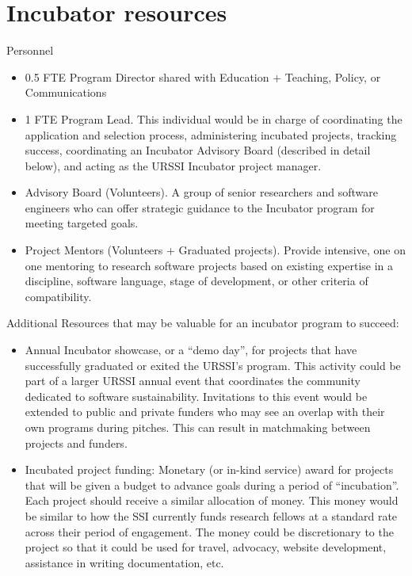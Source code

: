 \documentclass[
]{book}
\providecommand{\tightlist}{%
  \setlength{\itemsep}{0pt}\setlength{\parskip}{0pt}}
\begin{document}
\hypertarget{incubator-resources}{%
\section{Incubator resources}\label{incubator-resources}}

Personnel

\begin{itemize}
\tightlist
\item
  0.5 FTE Program Director shared with Education + Teaching, Policy, or Communications
\item
  1 FTE Program Lead. This individual would be in charge of coordinating the application and selection process, administering incubated projects, tracking success, coordinating an Incubator Advisory Board (described in detail below), and acting as the URSSI Incubator project manager.
\item
  Advisory Board (Volunteers). A group of senior researchers and software engineers who can offer strategic guidance to the Incubator program for meeting targeted goals.
\item
  Project Mentors (Volunteers + Graduated projects). Provide intensive, one on one mentoring to research software projects based on existing expertise in a discipline, software language, stage of development, or other criteria of compatibility.
\end{itemize}

Additional Resources that may be valuable for an incubator program to succeed:

\begin{itemize}
\tightlist
\item
  Annual Incubator showcase, or a ``demo day'', for projects that have successfully graduated or exited the URSSI's program. This activity could be part of a larger URSSI annual event that coordinates the community dedicated to software sustainability. Invitations to this event would be extended to public and private funders who may see an overlap with their own programs during pitches. This can result in matchmaking between projects and funders.
\item
  Incubated project funding: Monetary (or in-kind service) award for projects that will be given a budget to advance goals during a period of ``incubation''. Each project should receive a similar allocation of money. This money would be similar to how the SSI currently funds research fellows at a standard rate across their period of engagement. The money could be discretionary to the project so that it could be used for travel, advocacy, website development, assistance in writing documentation, etc.
\end{itemize}
\end{document}
